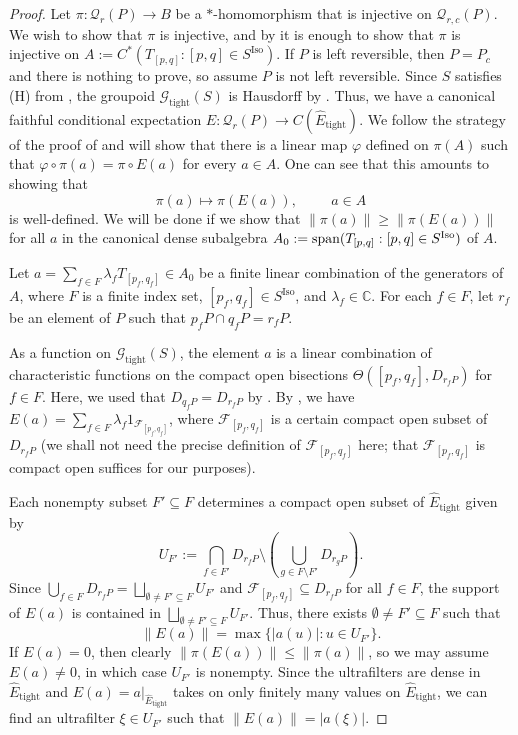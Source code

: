 \documentclass[12pt]{amsart}
\theoremstyle{definition}
\theoremstyle{remark}
\numberwithin{equation}{section}
\newcommand{\CC}{\mathbb{C}}
\newcommand{\Q}{\mathcal{Q}}
\newcommand{\iso}{\text{Iso}}
\newcommand{\Et}{\widehat E_{\text{tight}}}
\newcommand{\gt}{\mathcal{G}_{\text{tight}}}
\newcommand{\vp}{\varphi}
\newcommand{\cF}{\mathcal{F}}
\begin{document}
\begin{proof}
	Let $\pi:\Q_r(P)\to B$ be a $*$-homomorphism that is injective on $\Q_{r,c}(P)$. We wish to show that $\pi$ is injective, and by \cite[Theorem~3.4]{St22} it is enough to show that $\pi$ is injective on $A:= C^*(T_{[p,q]}: [p,q]\in S^\iso)$. If $P$ is left reversible, then $P=P_c$ and there is nothing to prove, so assume $P$ is not left reversible.
Since $S$ satisfies (H) from \cite[Definition~3.1]{St22}, the groupoid $\gt(S)$ is Hausdorff by \cite[Theorem~3.16]{EP}. Thus, we have a canonical faithful conditional expectation $E\colon \Q_r(P)\to C(\Et)$. We follow the strategy of the proof of \cite[Theorem~5.1]{LS22} and will show that there is a linear map $\vp$ defined on $\pi(A)$ such that $\vp\circ \pi(a) = \pi \circ E(a)$ for every $a\in A$. One can see that this amounts to showing that
	\[
	\pi(a) \mapsto \pi(E(a)), \hspace{1cm}a\in A
	\]
	is well-defined. We will be done if we show that $\|\pi(a)\| \geq \|\pi(E(a))\|$ for all $a$ in the canonical dense subalgebra $A_0:=\textup{span}(T_{[p,q]}: [p,q]\in S^\iso)$ of $A$. 
	
Let $a = \sum_{f\in F}\lambda_fT_{[p_f, q_f]}\in A_0$ be a finite linear combination of the generators of $A$, where $F$ is a finite index set, $[p_f, q_f]\in S^\iso$, and $\lambda_f\in\CC$.  
 For each $f\in F$, let $r_f$ be an element of $P$ such that $p_fP\cap q_fP = r_fP$. 
	
As a function on $\gt(S)$, the element $a$ is a linear combination of characteristic functions on the compact open bisections $\Theta([p_f,q_f], D_{r_{f}P})$ for $f\in F$. Here, we used that $D_{q_fP}=D_{r_fP}$ by \cite[Lemma~4.2]{St22}. By \cite[Proposition~3.14]{EP}, we have $E(a)=\sum_{f\in F}\lambda_f1_{\cF_{[p_f, q_f]}}$, where $\cF_{[p_f, q_f]}$ is a certain compact open subset of $D_{r_fP}$ (we shall not need the precise definition of $\cF_{[p_f, q_f]}$ here; that $\cF_{[p_f, q_f]}$ is compact open suffices for our purposes).

Each nonempty subset $F'\subseteq F$ determines a compact open subset of $\Et$ given by \begin{equation*}
		U_{F'}:= \bigcap_{f\in F'} D_{r_fP}\setminus \left(\bigcup_{g\in F\setminus F'} D_{r_gP}\right).
\end{equation*}
 Since $\bigcup_{f\in F}D_{r_fP}=\bigsqcup_{\emptyset\neq F'\subseteq F}U_{F'}$ and $\cF_{[p_f, q_f]}\subseteq D_{r_fP}$ for all $f\in F$, the support of $E(a)$ is contained in $\bigsqcup_{\emptyset\neq F'\subseteq F}U_{F'}$. Thus, there exists $\emptyset\neq F'\subseteq F$ such that 
 \[
 \|E(a)\|=\max\{|a(u)| : u \in U_{F'}\}.
 \]
 If $E(a)=0$, then clearly $\|\pi(E(a))\|\leq \|\pi(a)\|$, so we may assume $E(a)\neq 0$, in which case $U_{F'}$ is nonempty. Since the ultrafilters are dense in $\Et$ and $E(a)=a\vert_{\Et}$ takes on only finitely many values on $\Et$, we can find an ultrafilter $\xi\in U_{F'}$ such that $\|E(a)\|=|a(\xi)|$.
	

\end{proof}
\end{document}
